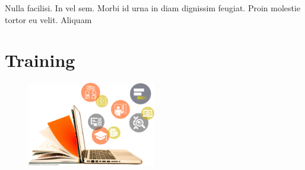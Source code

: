 \begin{savequote}[75mm]
Nulla facilisi. In vel sem. Morbi id urna in diam dignissim feugiat. Proin molestie tortor eu velit. Aliquam
\end{savequote}

\chapter{Training}
\label{training}

\begin{figure}
\centering
\includegraphics[width=0.5\textwidth]{chapters/images/training-coverart.jpg}
\end{figure}
\setcounter{figure}{-1}
\setcounter{table}{-1}
\setcounter{section}{-1}
